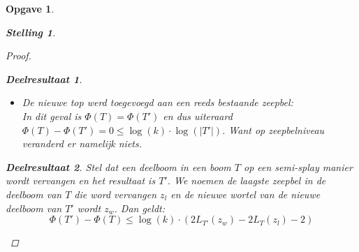\documentclass[12pt,hidelinks]{article}
\newtheorem{opgave}{Opgave}
\newtheorem{stelling}{Stelling}
\newtheorem{deelresultaat}{Deelresultaat}
\newcommand{\newln}{~\\\vspace{0.5em}}
\begin{document}
\begin{opgave}
\begin{description}
\begin{stelling}
\begin{proof}
\begin{deelresultaat}
\begin{itemize}
\begin{align*}
                                    &= \Phi(T)+\log(k)\cdot L_{T'}(z_1)+\log(k)\cdot(\sum_{i=1}^{k-1}{(L_{T'}(z_{i+1})-L_T(z_i))})
                                    \end{align*}
                                    Voor $i \ge 1$ geldt $A_T(z_i) \ge A_T(z_{i+1})+1$ en $A_T(z_{i+1})+1 = A_{T'}(z_{i+1})$.
                                    Dus $L_T(z_i) \ge L_{T'}(z_{i+1})$. Hieruit volgt dat $L_{T'}(z_{i+1})-L_T(z_i) \le 0$. 
                                    Uiteindelijk bekomen we:
                                    \begin{align*}
                                        \Phi(T') &\le \Phi(T) +\log(k)\cdot L_{T'}(z_1) \\
                                    &\le \Phi(T) +\log(k)\cdot \log(Z(T'))
                                \end{align*}
                                Want de wortelzeepbel heeft namelijk evenveel opvolgers (zichzelf meegeteld) als er zeepbellen in de boom zitten.
                                Een zeepbelboom bevat ook minstens evenveel toppen als zeepbellen dus $B(T) \le |T|$ en ook
                                $\log(B(T)) \le \log(|T|)$. We concluderen:
                                \begin{align*}
                                \Phi(T') &\le \Phi(T) + \log(k)\cdot \log(|T'|)\\
                                \Phi(T')-\Phi(T) &\le\log(k)\cdot \log(|T'|)
                                \end{align*}

                                \item De nieuwe top werd toegevoegd aan een reeds bestaande zeepbel:
                                    \newln
                                    In dit geval is $\Phi(T) = \Phi(T')$ en dus uiteraard $\Phi(T)-\Phi(T') = 0  \le\log(k)\cdot \log(|T'|)$. Want op zeepbelniveau veranderd er namelijk niets.
                                    
                            \end{itemize}
                        \end{deelresultaat}
                        \begin{deelresultaat}
                            Stel dat een deelboom in een boom $T$ op een semi-splay manier wordt vervangen en het resultaat is $T'$. We noemen de laagste zeepbel in de deelboom van $T$ die word vervangen $z_l$ en de nieuwe wortel van de nieuwe deelboom van $T'$ wordt $z_w$. Dan geldt:
                            \normalfont
                            $$\Phi(T') - \Phi(T) \le\log(k)\cdot( 2L_{T'}(z_w)-2L_T(z_l)-2)$$
                            


\end{deelresultaat}
\end{proof}
\end{stelling}
\end{description}
\end{opgave}
\end{document}
